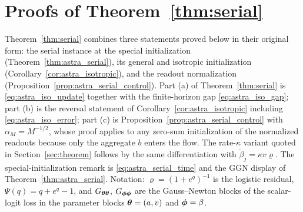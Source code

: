 
\section{Proofs of Theorem~\ref{thm:serial}}
\label{app:proofs}

Theorem~\ref{thm:serial} combines three statements proved below in their
original form: the serial instance at the special initialization
(Theorem~\ref{thm:astra_serial}), its general and isotropic initialization
(Corollary~\ref{cor:astra_isotropic}), and the readout normalization
(Proposition~\ref{prop:astra_serial_control}). Part (a) of
Theorem~\ref{thm:serial} is \eqref{eq:astra_iso_update} together with the
finite-horizon gap \eqref{eq:astra_iso_gap}; part (b) is the reversal
statement of Corollary~\ref{cor:astra_isotropic} including
\eqref{eq:astra_iso_error}; part (c) is
Proposition~\ref{prop:astra_serial_control} with $\alpha_M=M^{-1/2}$, whose
proof applies to any zero-sum initialization of the normalized readouts
because only the aggregate $b$ enters the flow. The rate-$\kappa$ variant
quoted in Section~\ref{sec:theorem} follows by the same differentiation with
$\dot\beta_j=\kappa v\varrho$. The special-initialization remark is
\eqref{eq:astra_serial_time} and the GGN display of
Theorem~\ref{thm:astra_serial}. Notation: $\varrho=(1+e^{q})^{-1}$ is the
logistic residual, $\Psi(q)=q+e^q-1$, and $G_{{\boldsymbol{\theta}}{\boldsymbol{\theta}}}$,
$G_{{\boldsymbol{\phi}}{\boldsymbol{\phi}}}$ are the Gauss--Newton blocks of the scalar-logit loss in
the parameter blocks ${\boldsymbol{\theta}}=(a,v)$ and ${\boldsymbol{\phi}}=\beta$.

\begingroup
\let\section\subsection
\let\subsection\subsubsection

\endgroup

